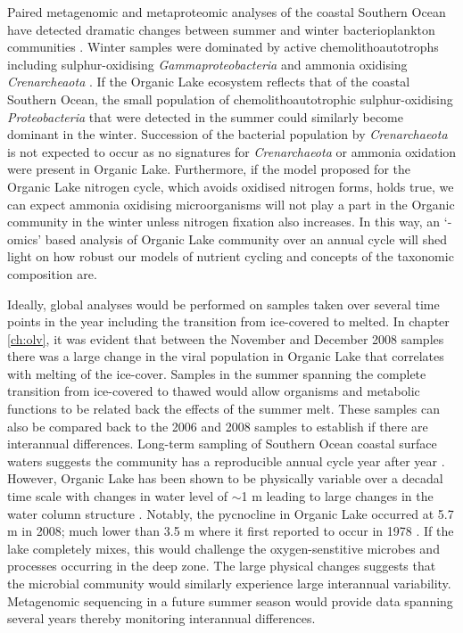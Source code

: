 Paired metagenomic and metaproteomic analyses of the coastal Southern Ocean have detected dramatic changes between summer and winter bacterioplankton communities \cite{Grzymski2012, Williams2012a}.
Winter samples were dominated by active chemolithoautotrophs including sulphur-oxidising \emph{Gammaproteobacteria} and ammonia oxidising \emph{Crenarcheaota} \cite{Grzymski2012, Williams2012b}.
If the Organic Lake ecosystem reflects that of the coastal Southern Ocean, the small population of chemolithoautotrophic sulphur-oxidising \emph{Proteobacteria} that were detected in the summer could similarly become dominant in the winter.
Succession of the bacterial population by \emph{Crenarchaeota} is not expected to occur as no signatures for \emph{Crenarchaeota} or ammonia oxidation were present in Organic Lake.
Furthermore, if the model proposed for the Organic Lake nitrogen cycle, which avoids oxidised nitrogen forms, holds true, we can expect ammonia oxidising microorganisms will not play a part in the Organic community in the winter unless nitrogen fixation also increases.
In this way, an `-omics' based analysis of Organic Lake community over an annual cycle will shed light on how robust our models of nutrient cycling and concepts of the taxonomic composition are.

Ideally, global analyses would be performed on samples taken over several time points in the year including the transition from ice-covered to melted.
In chapter \ref{ch:olv}, it was evident that between the November and December 2008 samples there was a large change in the viral population in Organic Lake that correlates with melting of the ice-cover.
Samples in the summer spanning the complete transition from ice-covered to thawed would allow organisms and metabolic functions to be related back the effects of the summer melt.
These samples can also be compared back to the 2006 and 2008 samples to establish if there are interannual differences.
Long-term sampling of Southern Ocean coastal surface waters suggests the community has a reproducible annual cycle year after year \cite{Murray2007}.
However, Organic Lake has been shown to be physically variable over a decadal time scale with changes in water level of $\sim$1 m leading to large changes in the water column structure \cite{Gibson1995, Gibson1996}.
Notably, the pycnocline in Organic Lake occurred at 5.7 m in 2008; much lower than 3.5 m where it first reported to occur in 1978 \cite{Franzmann1987b}.
If the lake completely mixes, this would challenge the oxygen-senstitive microbes and processes occurring in the deep zone.
The large physical changes suggests that the microbial community would similarly experience large interannual variability.
Metagenomic sequencing in a future summer season would provide data spanning several years thereby monitoring interannual differences.

